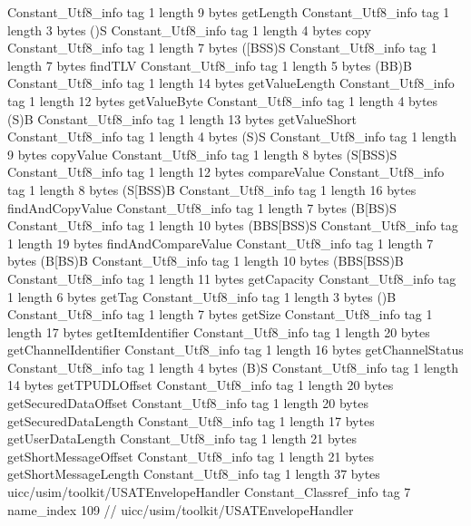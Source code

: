 {{{		}
		Constant_Utf8_info {
			tag	1
			length	9
			bytes	getLength
		}
		Constant_Utf8_info {
			tag	1
			length	3
			bytes	()S
		}
		Constant_Utf8_info {
			tag	1
			length	4
			bytes	copy
		}
		Constant_Utf8_info {
			tag	1
			length	7
			bytes	([BSS)S
		}
		Constant_Utf8_info {
			tag	1
			length	7
			bytes	findTLV
		}
		Constant_Utf8_info {
			tag	1
			length	5
			bytes	(BB)B
		}
		Constant_Utf8_info {
			tag	1
			length	14
			bytes	getValueLength
		}
		Constant_Utf8_info {
			tag	1
			length	12
			bytes	getValueByte
		}
		Constant_Utf8_info {
			tag	1
			length	4
			bytes	(S)B
		}
		Constant_Utf8_info {
			tag	1
			length	13
			bytes	getValueShort
		}
		Constant_Utf8_info {
			tag	1
			length	4
			bytes	(S)S
		}
		Constant_Utf8_info {
			tag	1
			length	9
			bytes	copyValue
		}
		Constant_Utf8_info {
			tag	1
			length	8
			bytes	(S[BSS)S
		}
		Constant_Utf8_info {
			tag	1
			length	12
			bytes	compareValue
		}
		Constant_Utf8_info {
			tag	1
			length	8
			bytes	(S[BSS)B
		}
		Constant_Utf8_info {
			tag	1
			length	16
			bytes	findAndCopyValue
		}
		Constant_Utf8_info {
			tag	1
			length	7
			bytes	(B[BS)S
		}
		Constant_Utf8_info {
			tag	1
			length	10
			bytes	(BBS[BSS)S
		}
		Constant_Utf8_info {
			tag	1
			length	19
			bytes	findAndCompareValue
		}
		Constant_Utf8_info {
			tag	1
			length	7
			bytes	(B[BS)B
		}
		Constant_Utf8_info {
			tag	1
			length	10
			bytes	(BBS[BSS)B
		}
		Constant_Utf8_info {
			tag	1
			length	11
			bytes	getCapacity
		}
		Constant_Utf8_info {
			tag	1
			length	6
			bytes	getTag
		}
		Constant_Utf8_info {
			tag	1
			length	3
			bytes	()B
		}
		Constant_Utf8_info {
			tag	1
			length	7
			bytes	getSize
		}
		Constant_Utf8_info {
			tag	1
			length	17
			bytes	getItemIdentifier
		}
		Constant_Utf8_info {
			tag	1
			length	20
			bytes	getChannelIdentifier
		}
		Constant_Utf8_info {
			tag	1
			length	16
			bytes	getChannelStatus
		}
		Constant_Utf8_info {
			tag	1
			length	4
			bytes	(B)S
		}
		Constant_Utf8_info {
			tag	1
			length	14
			bytes	getTPUDLOffset
		}
		Constant_Utf8_info {
			tag	1
			length	20
			bytes	getSecuredDataOffset
		}
		Constant_Utf8_info {
			tag	1
			length	20
			bytes	getSecuredDataLength
		}
		Constant_Utf8_info {
			tag	1
			length	17
			bytes	getUserDataLength
		}
		Constant_Utf8_info {
			tag	1
			length	21
			bytes	getShortMessageOffset
		}
		Constant_Utf8_info {
			tag	1
			length	21
			bytes	getShortMessageLength
		}
		Constant_Utf8_info {
			tag	1
			length	37
			bytes	uicc/usim/toolkit/USATEnvelopeHandler
		}
		Constant_Classref_info {
			tag	7
			name_index	109		// uicc/usim/toolkit/USATEnvelopeHandler
}}}
